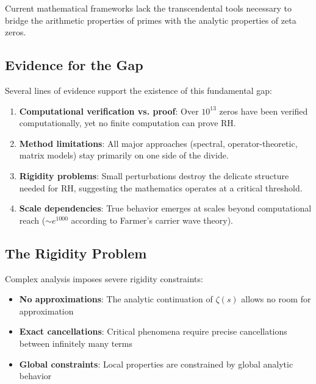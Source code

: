 \begin{theorem}
\label{thm:arithmetic_analytic_gap}
Current mathematical frameworks lack the transcendental tools necessary to bridge the arithmetic properties of primes with the analytic properties of zeta zeros.
\end{theorem}

\subsection{Evidence for the Gap}

Several lines of evidence support the existence of this fundamental gap:

\begin{enumerate}
\item \textbf{Computational verification vs. proof}: Over $10^{13}$ zeros have been verified computationally, yet no finite computation can prove RH.

\item \textbf{Method limitations}: All major approaches (spectral, operator-theoretic, matrix models) stay primarily on one side of the divide.

\item \textbf{Rigidity problems}: Small perturbations destroy the delicate structure needed for RH, suggesting the mathematics operates at a critical threshold.

\item \textbf{Scale dependencies}: True behavior emerges at scales beyond computational reach ($\sim e^{1000}$ according to Farmer's carrier wave theory).
\end{enumerate}

\subsection{The Rigidity Problem}

Complex analysis imposes severe rigidity constraints:

\begin{itemize}
\item \textbf{No approximations}: The analytic continuation of $\zeta(s)$ allows no room for approximation
\item \textbf{Exact cancellations}: Critical phenomena require precise cancellations between infinitely many terms
\item \textbf{Global constraints}: Local properties are constrained by global analytic behavior
\end{itemize}

